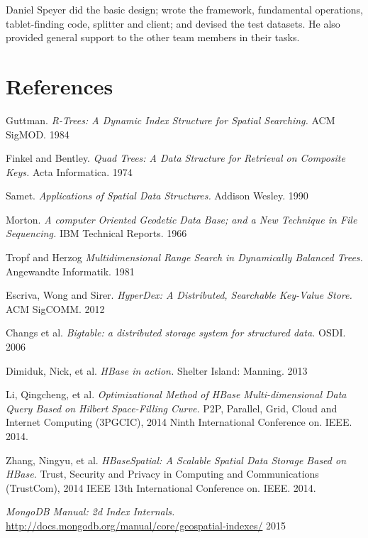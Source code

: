 \documentclass[11pt]{article}
\begin{document}
Daniel Speyer did the basic design; wrote the framework, fundamental operations, tablet-finding code, splitter and client; and devised the test datasets.  He also provided general support to the other team members in their tasks.

\section{References}

\raggedright

\begin{thebibliography}{99}

  Guttman.
  \emph{R-Trees: A Dynamic Index Structure for Spatial Searching.}
  ACM SigMOD.
  1984

  Finkel and Bentley.
  \emph{Quad Trees: A Data Structure for Retrieval on Composite Keys.}
  Acta Informatica.
  1974

  Samet.
  \emph{Applications of Spatial Data Structures.}
  Addison Wesley.
  1990

  Morton.
  \emph{A computer Oriented Geodetic Data Base; and a New Technique in File Sequencing.}
  IBM Technical Reports. 
  1966

 Tropf and Herzog
 \emph{Multidimensional Range Search in Dynamically Balanced Trees.}
 Angewandte Informatik.
 1981

  Escriva, Wong and Sirer.
  \emph{HyperDex: A Distributed, Searchable Key-Value Store.}
  ACM SigCOMM.
  2012

  Changs et al.
  \emph{Bigtable: a distributed storage system for structured data.}
  OSDI.
  2006

  Dimiduk, Nick, et al.
  \emph{HBase in action.}
   Shelter Island: Manning.
   2013

  Li, Qingcheng, et al.
  \emph{Optimizational Method of HBase Multi-dimensional Data Query Based on Hilbert Space-Filling Curve.}
   P2P, Parallel, Grid, Cloud and Internet Computing (3PGCIC), 2014 Ninth International Conference on. IEEE.
   2014.

  Zhang, Ningyu, et al. 
  \emph{HBaseSpatial: A Scalable Spatial Data Storage Based on HBase.}
   Trust, Security and Privacy in Computing and Communications (TrustCom), 2014 IEEE 13th International Conference on. IEEE.
   2014. 
   
  \emph{MongoDB Manual: 2d Index Internals.}
  \url{http://docs.mongodb.org/manual/core/geospatial-indexes/}
  2015



\end{thebibliography}
\end{document}
